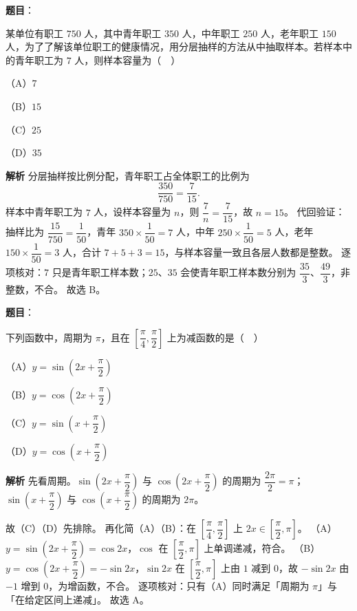 \begin{answer}

\textbf{题目}：

某单位有职工 $750$ 人，其中青年职工 $350$ 人，中年职工 $250$ 人，老年职工 $150$ 人，为了了解该单位职工的健康情况，用分层抽样的方法从中抽取样本。若样本中的青年职工为 $7$ 人，则样本容量为（　）

（A）$7$

（B）$15$

（C）$25$

（D）$35$

\textbf{解析}
分层抽样按比例分配，青年职工占全体职工的比例为
\nopagebreak[4]
\[\frac{350}{750}=\frac{7}{15}.\]
样本中青年职工为 $7$ 人，设样本容量为 $n$，则 $\dfrac{7}{n}=\dfrac{7}{15}$，故 $n=15$。
代回验证：抽样比为 $\dfrac{15}{750}=\dfrac1{50}$，青年 $350\times\dfrac1{50}=7$ 人，中年 $250\times\dfrac1{50}=5$ 人，老年 $150\times\dfrac1{50}=3$ 人，合计 $7+5+3=15$，与样本容量一致且各层人数都是整数。
逐项核对：$7$ 只是青年职工样本数；$25$、$35$ 会使青年职工样本数分别为 $\dfrac{35}{3}$、$\dfrac{49}{3}$，非整数，不合。
故选 B。


\end{answer}
\begin{answer}

\textbf{题目}：

下列函数中，周期为 $\pi$，且在 $\left[\dfrac{\pi}{4},\dfrac{\pi}{2}\right]$ 上为减函数的是（　）

（A）$y=\sin\left(2x+\dfrac{\pi}{2}\right)$

（B）$y=\cos\left(2x+\dfrac{\pi}{2}\right)$

（C）$y=\sin\left(x+\dfrac{\pi}{2}\right)$

（D）$y=\cos\left(x+\dfrac{\pi}{2}\right)$

\textbf{解析}
先看周期。$\sin\left(2x+\dfrac{\pi}{2}\right)$ 与 $\cos\left(2x+\dfrac{\pi}{2}\right)$ 的周期为 $\dfrac{2\pi}{2}=\pi$；$\sin\left(x+\dfrac{\pi}{2}\right)$ 与 $\cos\left(x+\dfrac{\pi}{2}\right)$ 的周期为 $2\pi$。

故（C）（D）先排除。
再化简（A）（B）：在 $\left[\dfrac{\pi}{4},\dfrac{\pi}{2}\right]$ 上 $2x\in\left[\dfrac{\pi}{2},\pi\right]$。
（A）$y=\sin\left(2x+\dfrac{\pi}{2}\right)=\cos2x$，$\cos$ 在 $\left[\dfrac{\pi}{2},\pi\right]$ 上单调递减，符合。
（B）$y=\cos\left(2x+\dfrac{\pi}{2}\right)=-\sin2x$，$\sin2x$ 在 $\left[\dfrac{\pi}{2},\pi\right]$ 上由 $1$ 减到 $0$，故 $-\sin2x$ 由 $-1$ 增到 $0$，为增函数，不合。
逐项核对：只有（A）同时满足「周期为 $\pi$」与「在给定区间上递减」。
故选 A。


\end{answer}
